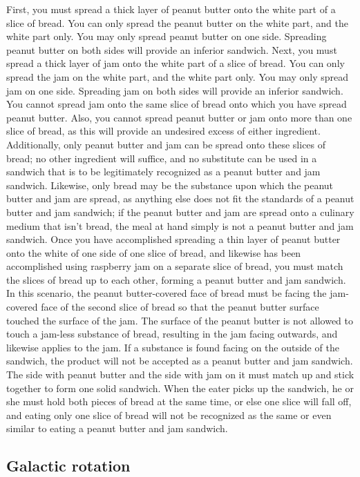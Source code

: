 \documentclass[a4paper, titlepage, oneside]{article}
\begin{document}
\begin{multicols}{2}
First, you must spread a thick layer of peanut butter onto the white part of a slice of bread. You can only spread the peanut butter on the white part, and the white part only. You may only spread peanut butter on one side. Spreading peanut butter on both sides will provide an inferior sandwich. Next, you must spread a thick layer of jam onto the white part of a slice of bread. You can only spread the jam on the white part, and the white part only. You may only spread jam on one side. Spreading jam on both sides will provide an inferior sandwich. You cannot spread jam onto the same slice of bread onto which you have spread peanut butter. Also, you cannot spread peanut butter or jam onto more than one slice of bread, as this will provide an undesired excess of either ingredient. Additionally, only peanut butter and jam can be spread onto these slices of bread; no other ingredient will suffice, and no substitute can be used in a sandwich that is to be legitimately recognized as a peanut butter and jam sandwich. Likewise, only bread may be the substance upon which the peanut butter and jam are spread, as anything else does not fit the standards of a peanut butter and jam sandwich; if the peanut butter and jam are spread onto a culinary medium that isn’t bread, the meal at hand simply is not a peanut butter and jam sandwich. Once you have accomplished spreading a thin layer of peanut butter onto the white of one side of one slice of bread, and likewise has been accomplished using raspberry jam on a separate slice of bread, you must match the slices of bread up to each other, forming a peanut butter and jam sandwich. In this scenario, the peanut butter-covered face of bread must be facing the jam-covered face of the second slice of bread so that the peanut butter surface touched the surface of the jam. The surface of the peanut butter is not allowed to touch a jam-less substance of bread, resulting in the jam facing outwards, and likewise applies to the jam. If a substance is found facing on the outside of the sandwich, the product will not be accepted as a peanut butter and jam sandwich. The side with peanut butter and the side with jam on it must match up and stick together to form one solid sandwich. When the eater picks up the sandwich, he or she must hold both pieces of bread at the same time, or else one slice will fall off, and eating only one slice of bread will not be recognized as the same or even similar to eating a peanut butter and jam sandwich.

\subsection{Galactic rotation}
\label{sec:gal-rot}

\end{multicols}
\end{document}
